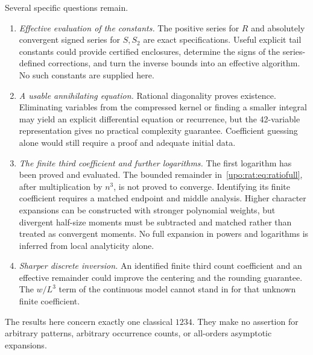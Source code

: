 \documentclass[11pt,letterpaper]{article}
\theoremstyle{remark}\newtheorem{remark}[theorem]{Remark}
\numberwithin{equation}{section}
\begin{document}
Several specific questions remain.
\begin{enumerate}
\item \emph{Effective evaluation of the constants.} The positive series
for $R$ and absolutely convergent signed series for $S,S_2$ are exact
specifications. Useful explicit tail constants could provide certified
enclosures, determine the signs of the series-defined corrections, and turn the inverse
bounds into an effective algorithm. No such constants are supplied here.
\item \emph{A usable annihilating equation.} Rational diagonality proves
existence. Eliminating variables from the compressed kernel or finding
a smaller integral may yield an explicit differential equation or
recurrence, but the 42-variable representation gives no practical
complexity guarantee. Coefficient guessing alone would still require
a proof and adequate initial data.
\item \emph{The finite third coefficient and further logarithms.}
The first logarithm has been proved and evaluated. The bounded remainder
in~\eqref{upo:rat:eq:ratiofull}, after multiplication by $n^3$, is not proved to
converge. Identifying its finite coefficient requires a matched endpoint
and middle analysis. Higher character expansions can be constructed
with stronger polynomial weights, but divergent half-size moments must
be subtracted and matched rather than treated as convergent moments.
No full expansion in powers and logarithms is inferred from local
analyticity alone.
\item \emph{Sharper discrete inversion.} An identified finite third
count coefficient and an effective remainder could improve the
centering and the rounding guarantee. The $w/L^3$ term of the continuous
model cannot stand in for that unknown finite coefficient.
\end{enumerate}
The results here concern exactly one classical $1234$. They make no
assertion for arbitrary patterns, arbitrary occurrence counts, or
all-orders asymptotic expansions.
\end{document}
